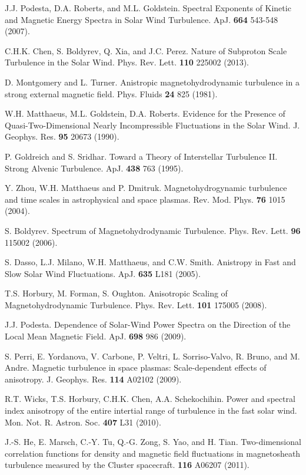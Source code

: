 \documentclass[aps,prl,amsmath,amssymb,reprint,superscriptaddress]{revtex4-1} %
\begin{document}
\begin{thebibliography}{99}
 J.J. Podesta, D.A. Roberts, and M.L. Goldstein. Spectral Exponents of Kinetic and Magnetic Energy Spectra in Solar Wind Turbulence. ApJ. {\bf 664} 543-548 (2007).

 C.H.K. Chen, S. Boldyrev, Q. Xia, and J.C. Perez. Nature of Subproton Scale Turbulence in the Solar Wind. Phys. Rev. Lett. {\bf 110} 225002 (2013).

 D. Montgomery and L. Turner. Anistropic magnetohydrodynamic turbulence in a strong external magnetic field. Phys. Fluids {\bf 24} 825 (1981).

 W.H. Matthaeus, M.L. Goldstein, D.A. Roberts. Evidence for the Presence of Quasi-Two-Dimensional Nearly Incompressible Fluctuations in the Solar Wind. J. Geophys. Res. {\bf 95} 20673 (1990).

 P. Goldreich and S. Sridhar. Toward a Theory of Interstellar Turbulence II. Strong Alvenic Turbulence. ApJ. {\bf 438} 763 (1995).

 Y. Zhou, W.H. Matthaeus and P. Dmitruk. Magnetohydrogynamic turbulence and time scales in astrophysical and space plasmas. Rev. Mod. Phys. {\bf 76} 1015 (2004).

 S. Boldyrev. Spectrum of Magnetohydrodynamic Turbulence. Phys. Rev. Lett. {\bf 96} 115002 (2006).

 S. Dasso, L.J. Milano, W.H. Matthaeus, and C.W. Smith. Anistropy in Fast and Slow Solar Wind Fluctuations. ApJ. {\bf 635} L181 (2005).

 T.S. Horbury, M. Forman, S. Oughton. Anisotropic Scaling of Magnetohydrodynamic Turbulence. Phys. Rev. Lett. {\bf 101} 175005 (2008).

 J.J. Podesta. Dependence of Solar-Wind Power Spectra on the Direction of the Local Mean Magnetic Field. ApJ. {\bf 698} 986 (2009).

 S. Perri, E. Yordanova, V. Carbone, P. Veltri, L. Sorriso-Valvo, R. Bruno, and M. Andre. Magnetic turbulence in space plasmas: Scale-dependent effects of anisotropy. J. Geophys. Res. {\bf 114} A02102 (2009).

 R.T. Wicks, T.S. Horbury, C.H.K. Chen, A.A. Schekochihin. Power and spectral index anisotropy of the entire intertial range of turbulence in the fast solar wind. Mon. Not. R. Astron. Soc. {\bf 407} L31 (2010).

 J.-S. He, E. Marsch, C.-Y. Tu, Q.-G. Zong, S. Yao, and H. Tian. Two-dimensional correlation functions for density and magnetic field fluctuations in magnetosheath turbulence measured by the Cluster spacecraft. {\bf 116} A06207 (2011).


\end{thebibliography}
\end{document}
